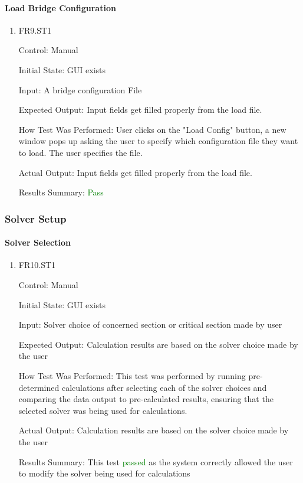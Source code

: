 \documentclass[12pt, titlepage]{article}
\begin{document}
\paragraph{Load Bridge Configuration}

\begin{enumerate}
  
  \item{FR9.ST1\\}
  
  Control: Manual
  
  Initial State: GUI exists
  
  Input: A bridge configuration File
  
  Expected Output: Input fields get filled properly from the load file.
  
  How Test Was Performed: User clicks on the "Load Config" button, a new window pops up asking the user to specify which configuration file they want to load. The user specifies the file.

  Actual Output: Input fields get filled properly from the load file.
    
  Results Summary: \textcolor{green} {Pass}  

\end{enumerate}

\subsubsection{Solver Setup}

\paragraph{Solver Selection}

\begin{enumerate}

  \item{FR10.ST1\\}

  Control: Manual
            
  Initial State: GUI exists
            
  Input: Solver choice of concerned section or critical section made by user
            
  Expected Output: Calculation results are based on the solver choice made by the user
         
  How Test Was Performed: This test was performed by running pre-determined calculations after selecting each of the solver choices and comparing the data output to pre-calculated results, ensuring that the selected solver was being used for calculations. 
	
  Actual Output: Calculation results are based on the solver choice made by the user

  Results Summary: This test \textcolor{green} {passed} as the system correctly allowed the user to modify the solver being used for calculations
				
\end{enumerate}
\end{document}
